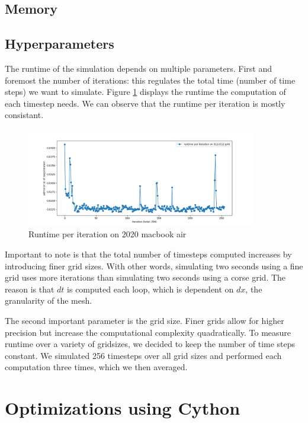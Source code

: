 \documentclass[a4paper,12pt]{article}
\begin{document}
\subsection{Memory}

\subsection{Hyperparameters}
The runtime of the simulation depends on multiple parameters.
First and foremost the number of iterations:
this regulates the total time (number of time steps) we want to simulate.
Figure \ref{fig:runtime_per_iteration} displays the runtime the computation of each timestep needs.
We can observe that the runtime per iteration is mostly consistant.
\begin{figure}[h]
  \centering
  \includegraphics[width=0.9\textwidth]{imgs/runtime_baseline_per_iteration}
  \caption{Runtime per iteration on 2020 macbook air}
  \label{fig:runtime_per_iteration}
\end{figure}
Important to note is that the total number of timesteps computed increases by introducing finer grid sizes.
With other words, simulating two seconds using a fine grid uses more iterations than simulating two seconds using a corse grid. 
The reason is that $dt$ is computed each loop, which is dependent on $dx$, the granularity of the mesh.

The second important parameter is the grid size.
Finer grids allow for higher precision but increase the computational complexity quadratically.
To measure runtime over a variety of gridsizes, we decided to keep the number of time steps constant.
We simulated 256 timesteps over all grid sizes and performed each computation three times, which we then averaged.

\section{Optimizations using Cython}
\end{document}
